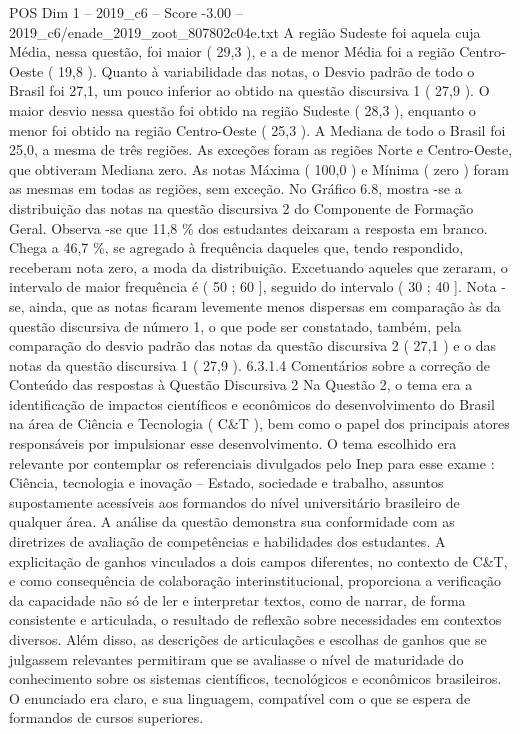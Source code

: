 \begin{textsample}{POS Dim 1 – 2019\_c6 – Score -3.00 – 2019\_c6/enade\_2019\_zoot\_807802c04e.txt}
A região Sudeste foi aquela cuja Média, nessa questão, foi maior ( 29,3 ), e a de menor Média foi a região Centro-Oeste ( 19,8 ).
Quanto à variabilidade das notas, o Desvio padrão de todo o Brasil foi 27,1, um pouco inferior ao obtido na questão discursiva 1 ( 27,9 ).
O maior desvio nessa questão foi obtido na região Sudeste ( 28,3 ), enquanto o menor foi obtido na região Centro-Oeste ( 25,3 ).
A Mediana de todo o Brasil foi 25,0, a mesma de três regiões.
As exceções foram as regiões Norte e Centro-Oeste, que obtiveram Mediana zero.
As notas Máxima ( 100,0 ) e Mínima ( zero ) foram as mesmas em todas as regiões, sem exceção.
No Gráfico 6.8, mostra -se a distribuição das notas na questão discursiva 2 do Componente de Formação Geral.
Observa -se que 11,8 \% dos estudantes deixaram a resposta em branco.
Chega a 46,7 \%, se agregado à frequência daqueles que, tendo respondido, receberam nota zero, a moda da distribuição.
Excetuando aqueles que zeraram, o intervalo de maior frequência é ( 50 ; 60 ], seguido do intervalo ( 30 ; 40 ].
Nota -se, ainda, que as notas ficaram levemente menos dispersas em comparação às da questão discursiva de número 1, o que pode ser constatado, também, pela comparação do desvio padrão das notas da questão discursiva 2 ( 27,1 ) e o das notas da questão discursiva 1 ( 27,9 ). 6.3.1.4 Comentários sobre a correção de Conteúdo das respostas à Questão Discursiva 2 Na Questão 2, o tema era a identificação de impactos científicos e econômicos do desenvolvimento do Brasil na área de Ciência e Tecnologia ( C\&T ), bem como o papel dos principais atores responsáveis por impulsionar esse desenvolvimento.
O tema escolhido era relevante por contemplar os referenciais divulgados pelo Inep para esse exame : Ciência, tecnologia e inovação – Estado, sociedade e trabalho, assuntos supostamente acessíveis aos formandos do nível universitário brasileiro de qualquer área.
A análise da questão demonstra sua conformidade com as diretrizes de avaliação de competências e habilidades dos estudantes.
A explicitação de ganhos vinculados a dois campos diferentes, no contexto de C\&T, e como consequência de colaboração interinstitucional, proporciona a verificação da capacidade não só de ler e interpretar textos, como de narrar, de forma consistente e articulada, o resultado de reflexão sobre necessidades em contextos diversos.
Além disso, as descrições de articulações e escolhas de ganhos que se julgassem relevantes permitiram que se avaliasse o nível de maturidade do conhecimento sobre os sistemas científicos, tecnológicos e econômicos brasileiros.
O enunciado era claro, e sua linguagem, compatível com o que se espera de formandos de cursos superiores.

\end{textsample}
